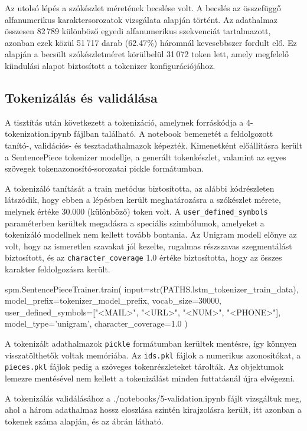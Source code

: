 Az utolsó lépés a szókészlet méretének becslése volt. 
A becslés az összefüggő alfanumerikus karaktersorozatok vizsgálata alapján történt. 
Az adathalmaz összesen 82\,789 különböző egyedi alfanumerikus szekvenciát tartalmazott, azonban ezek közül 51\,717 darab (62.47\%) háromnál kevesebbszer fordult elő. 
Ez alapján a becsült szókészletméret körülbelül 31\,072 token lett, amely megfelelő kiindulási alapot biztosított a tokenizer konfigurációjához.
\subsection{Tokenizálás és validálása}

A tisztítás után következett a tokenizáció, amelynek forráskódja a 4-tokenization.ipynb fájlban található. 
A notebook bemenetét a feldolgozott tanító-, validációs- és tesztadathalmazok képezték. Kimenetként előállításra került a SentencePiece tokenizer modellje, 
a generált tokenkészlet, valamint az egyes szövegek tokenazonosító-sorozatai pickle formátumban.

A tokenizáló tanítását a train metódus biztosította, az alábbi kódrészleten látszódik, 
hogy ebben a lépésben került meghatározásra a szókészlet mérete, melynek értéke 30.000 (különböző) token volt.
A \texttt{user\_defined\_symbols} paraméterben kerültek megadásra a speciális szimbólumok, amelyeket a tokenizáló modellnek nem kellett tovább bontania.
Az Unigram modell előnye az volt, hogy az ismeretlen szavakat jól kezelte, rugalmas részszavas szegmentálást biztosított, és az \texttt{character\_coverage} 1.0 értéke biztosította, 
hogy az összes karakter feldolgozásra került.

\begin{python}[caption={Példa: tokenizálás memóriában},label=py:token-ex]
spm.SentencePieceTrainer.train(
    input=str(PATHS.lstm_tokenizer_train_data),
    model_prefix=tokenizer_model_prefix,
    vocab_size=30000,
    user_defined_symbols=["<MAIL>", "<URL>", "<NUM>", "<PHONE>"],
    model_type='unigram',
    character_coverage=1.0
)
\end{python}

A tokenizált adathalmazok \texttt{pickle} formátumban kerültek mentésre, így könnyen visszatölthetők voltak memóriába.
Az \texttt{ids.pkl} fájlok a numerikus azonosítókat, a \texttt{pieces.pkl} fájlok pedig a szöveges tokenrészleteket tárolták.
Az objektumok lemezre mentésével nem kellett a tokenizálást minden futtatásnál újra elvégezni.

A tokenizálás validálásához a ./notebooks/5-validation.ipynb fájlt vizsgáltuk meg, ahol a három adathalmaz hossz eloszlása 
szintén kirajzolásra került, itt azonban a tokenek száma alapján, és az  ábrán látható.

